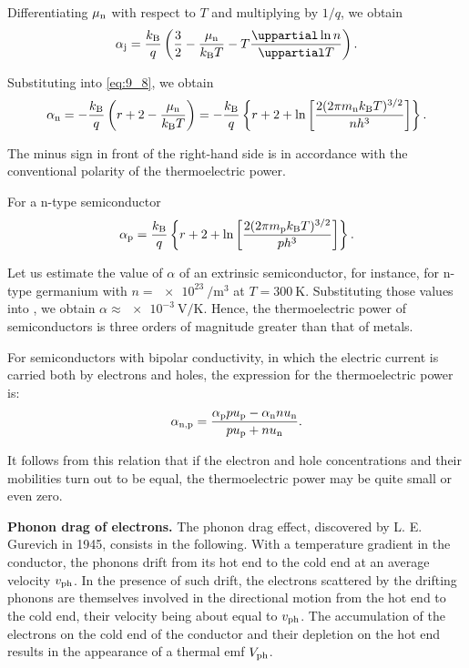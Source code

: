 \noindent
Differentiating $\mu_{\text{n}}$ with respect to $T$ and multiplying by $1/q$, we obtain
\begin{equation}\label{eq:9_16}
    \ab{\alpha}{j} = \frac{\ab{k}{B}}{q} \parenthesis{ \frac{3}{2} - \frac{\ab{\mu}{n}}{\ab{k}{B}T} - T \diffpartial{\ln{n}}{T}}.
\end{equation}

\noindent
Substituting  into \eqref{eq:9_8}, we obtain
\begin{equation}\label{eq:9_17}
    \alpha_{\text{n}} = - \frac{k_{\text{B}}}{q} \left(r + 2 - \frac{\mu_{\text{n}}}{k_{\text{B}}T}\right) = - \frac{k_{\text{B}}}{q} \left\{r + 2 + \ln\left[\frac{2(2\pi m_{\text{n}}k_{\text{B}}T)^{3/2}}{nh^3}\right]\right\}.
\end{equation}

\noindent
The minus sign in front of the right-hand side is in accordance with the conventional polarity of the thermoelectric power.

For a n-type semiconductor
\begin{equation}\label{eq:9_18}
    \alpha_{\text{p}} = \frac{k_{\text{B}}}{q} \left\{r + 2 + \ln\left[\frac{2 (2 \pi m_{\text{p}} k_{\text{B}} T)^{3/2}}{ph^3}\right]\right\}.
\end{equation}

Let us estimate the value of $\alpha$ of an extrinsic semiconductor, for instance, for n-type germanium with $n=\SI{e23}{\per\metre\cubed}$ at $T=\SI{300}{\kelvin}$. Substituting those values into , we obtain $\alpha\approx\SI{e-3}{\volt\per\kelvin}$. Hence, the thermoelectric power of semiconductors is three orders of magnitude greater than that of metals.

For semiconductors with bipolar conductivity, in which the electric current is carried both by electrons and holes, the expression for the thermoelectric power is:
\begin{equation}\label{eq:9_19}
    \alpha_{\text{n,p}} = \frac{\alpha_{\text{p}} p u_{\text{p}} - \alpha_{\text{n}} n u_{\text{n}}}{p u_{\text{p}} + n u_{\text{n}}}.
\end{equation}

\noindent
It follows from this relation that if the electron and hole concentrations and their mobilities turn out to be equal, the thermoelectric power may be quite small or even zero.

\textbf{Phonon drag of electrons.} The phonon drag effect, discovered by L. E. Gurevich in 1945, consists in the following. With a temperature gradient in the conductor, the phonons drift from its hot end to the cold end at an average velocity $v_{\text{ph}}$. In the presence of such drift, the electrons scattered by the drifting phonons are themselves involved in the directional motion from the hot end to the cold end, their velocity being about equal to $v_{\text{ph}}$. The accumulation of the electrons on the cold end of the conductor and their depletion on the hot end results in the appearance of a thermal emf $V_{\text{ph}}$.


